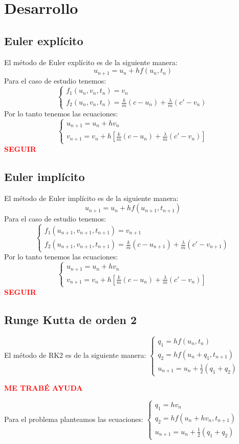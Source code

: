 \section{Desarrollo}
\subsection{Euler explícito}
El método de Euler explícito es de la siguiente manera:
\begin{equation}
u_{n+1} = u_n + h f(u_n, t_n)    
\end{equation}
Para el caso de estudio tenemos:
\[
\begin{cases}
    f_1(u_n,v_n,t_n) = v_n \\
    f_2(u_n,v_n,t_n) = \frac{k}{m}(c - u_n) + \frac{\lambda}{m}(c' - v_n)
\end{cases}
\]
Por lo tanto tenemos las ecuaciones:
\[
\begin{cases}
    u_{n+1} = u_n+hv_n \\
    v_{n+1} = v_n + h [\frac{k}{m}(c - u_n) + \frac{\lambda}{m}(c' - v_n)]
\end{cases}
\]
\textcolor{red}{\textbf{SEGUIR}}
\subsection{Euler implícito}
El método de Euler implícito es de la siguiente manera:
\begin{equation}
u_{n+1} = u_n + h f(u_{n+1}, t_{n+1})
\end{equation}
Para el caso de estudio tenemos:
\[
\begin{cases}
    f_1(u_{n+1},v_{n+1},t_{n+1}) = v_{n+1} \\
    f_2(u_{n+1},v_{n+1},t_{n+1}) = \frac{k}{m}(c - u_{n+1}) + \frac{\lambda}{m}(c' - v_{n+1})
\end{cases}
\]
Por lo tanto tenemos las ecuaciones:
\[
\begin{cases}
    u_{n+1} = u_n+hv_n \\
    v_{n+1} = v_n + h [\frac{k}{m}(c - u_n) + \frac{\lambda}{m}(c' - v_n)]
\end{cases}
\]
\textcolor{red}{\textbf{SEGUIR}}
\subsection{Runge Kutta de orden 2}
El método de RK2 es de la siguiente manera:
$
\begin{cases}
    q_1 = h f(u_n, t_n) \\
    q_2 = h f(u_n + q_1, t_{n+1}) \\
    u_{n+1} = u_n + \frac{1}{2} (q_1 + q_2)    
\end{cases}
$

\textcolor{red}{\textbf{ME TRABÉ AYUDA}}

Para el problema planteamos las ecuaciones:
$
\begin{cases}
    q_1 = hv_n \\
    q_2 = hf(u_n+hv_n,t_{n+1}) \\
    u_{n+1} = u_n + \frac{1}{2} (q_1+q_2)    
\end{cases}
$